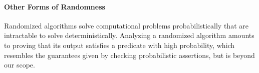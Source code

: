 





\paragraph{Other Forms of Randomness} %
Randomized algorithms solve computational problems
probabilistically that are intractable to solve deterministically.
Analyzing a randomized algorithm amounts to proving that its output satisfies
a predicate with high probability, which resembles the guarantees given by
checking probabilistic assertions, but is beyond our scope.
